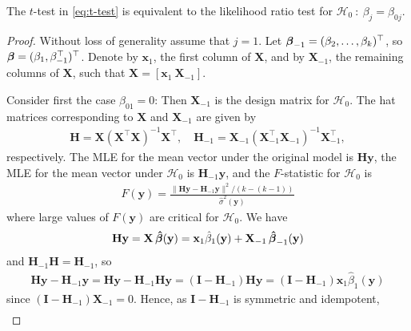 \begin{theorem}
    The $t$-test in \eqref{eq:t-test} is equivalent to the likelihood ratio test for $\mathcal{H}_0 \ : \ \beta_j = \beta_{0j}$.
\end{theorem}
\begin{proof}
    Without loss of generality assume that $j = 1$.
    Let $\operatorname{\boldsymbol{\beta}}_{-1} = (\beta_2, \ldots, \beta_k)^\top$, so $\operatorname{\boldsymbol{\beta}} = (\beta_1, \beta_{-1}^\top)^\top$.
    Denote by $\textbf{x}_1$, the first column of $\textbf{X}$, and by $\textbf{X}_{-1}$, the remaining columns of $\textbf{X}$, such that $\textbf{X} = \left[\textbf{x}_1 \ \textbf{X}_{-1}\right]$.
    
    Consider first the case $\beta_{01} = 0$: Then $\textbf{X}_{-1}$ is the design matrix for $\mathcal{H}_0$.
    The hat matrices corresponding to $\textbf{X}$ and $\textbf{X}_{-1}$ are given by
    \begin{align*}
        \textbf{H} = \textbf{X}(\textbf{X}^\top\textbf{X})^{-1}\textbf{X}^\top, \quad \mathbf{H}_{-1} = \textbf{X}_{-1}(\textbf{X}^\top_{-1}\textbf{X}_{-1})^{-1}\textbf{X}^\top_{-1},
    \end{align*}
    respectively.
    The MLE for the mean vector under the original model is $\textbf{H}\textbf{y}$, the MLE for the mean vector under $\mathcal{H}_0$ is $\textbf{H}_{-1}\textbf{y}$, and the $F$-statistic for $\mathcal{H}_0$ is
    \begin{align*}
        F(\textbf{y}) = \frac{\|\textbf{H}\textbf{y} - \textbf{H}_{-1}\textbf{y}\|^2/(k-(k-1))}{\hat{\sigma}^2(\textbf{y})}
    \end{align*}
    where large values of $F(\textbf{y})$ are critical for $\mathcal{H}_0$.
    We have
    \begin{align*}
        \textbf{H}\textbf{y} = \textbf{X}\operatorname{\boldsymbol{\hat{\beta}}}(\textbf{y}) = \textbf{x}_1\hat{\beta}_1(\textbf{y}) + \textbf{X}_{-1} \operatorname{\boldsymbol{\hat{\beta}}}_{-1}(\textbf{y})
    \end{align*}
    and $\textbf{H}_{-1}\textbf{H} = \textbf{H}_{-1}$, so
    \begin{align*}
        \textbf{H}\textbf{y}-\textbf{H}_{-1}\textbf{y} = 
        \textbf{H}\textbf{y}-\textbf{H}_{-1}\textbf{H}\textbf{y} =
        (\textbf{I} - \textbf{H}_{-1})\textbf{H}\textbf{y} = 
        (\textbf{I} - \textbf{H}_{-1})\textbf{x}_1\hat{\beta}_1(\textbf{y})
    \end{align*}
    since $(\textbf{I} - \textbf{H}_{-1})\textbf{X}_{-1} = 0$.
    Hence, as $\textbf{I} - \textbf{H}_{-1}$ is symmetric and idempotent,
    \begin{align*}

\end{align*}
\end{proof}
